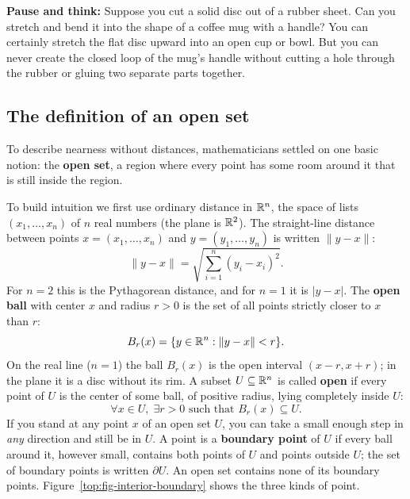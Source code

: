 \begin{walkbox}
\textbf{Pause and think:} Suppose you cut a solid disc out of a rubber sheet. Can you stretch and bend it into the shape of a coffee mug with a handle? You can certainly stretch the flat disc upward into an open cup or bowl. But you can never create the closed loop of the mug's handle without cutting a hole through the rubber or gluing two separate parts together.
\end{walkbox}

\subsection{The definition of an open set}

To describe nearness without distances, mathematicians settled on one basic notion: the \textbf{open set}, a region where every point has some room around it that is still inside the region.

To build intuition we first use ordinary distance in $\mathbb{R}^n$, the space of lists $(x_1, \dots, x_n)$ of $n$ real numbers (the plane is $\mathbb{R}^2$). The straight-line distance between points $x = (x_1, \dots, x_n)$ and $y = (y_1, \dots, y_n)$ is written $\|y - x\|$:
\[
\|y - x\| = \sqrt{\sum_{i=1}^{n} (y_i - x_i)^2}.
\]
For $n = 2$ this is the Pythagorean distance, and for $n = 1$ it is $|y - x|$. The \textbf{open ball} with center $x$ and radius $r > 0$ is the set of all points strictly closer to $x$ than $r$:
\[
B_r(x) = \{y \in \mathbb{R}^n : \|y - x\| < r\}.
\]
On the real line ($n = 1$) the ball $B_r(x)$ is the open interval $(x - r, x + r)$; in the plane it is a disc without its rim. A subset $U \subseteq \mathbb{R}^n$ is called \textbf{open} if every point of $U$ is the center of some ball, of positive radius, lying completely inside $U$:
\[
\forall x \in U, \; \exists r > 0 \text{ such that } B_r(x) \subseteq U.
\]
If you stand at any point $x$ of an open set $U$, you can take a small enough step in \emph{any} direction and still be in $U$. A point is a \textbf{boundary point} of $U$ if every ball around it, however small, contains both points of $U$ and points outside $U$; the set of boundary points is written $\partial U$. An open set contains none of its boundary points. Figure~\ref{top:fig-interior-boundary} shows the three kinds of point.

